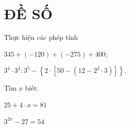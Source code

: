 \section{ĐỀ SỐ \thesection } %
\setcounter{bt}{0}

\begin{bt} Thực hiện các phép tính
	\begin{listEX}[2]
		\item $345 + (-120) + (-275) + 400$;
		\item $3^{4} \cdot 3^{2} : 3^{5} - \left\{2 \cdot \left[50 - \left(12 - 2^{2} \cdot 3\right)\right]\right\}$.
	\end{listEX}
\end{bt}


\begin{bt}Tìm  $x$ biết:
	\begin{listEX}[2]
		\item $25 + 4 \cdot x = 81$
		\item  $3^{2x} - 27 = 54$
	\end{listEX}
\end{bt}



